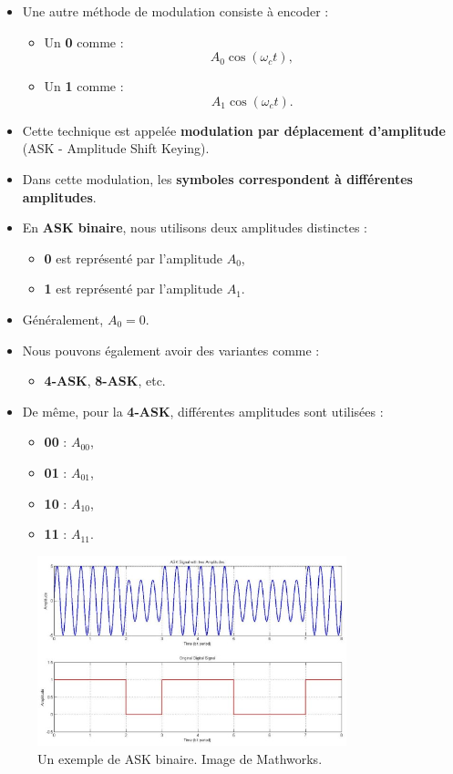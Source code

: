 \begin{itemize}
    \item Une autre méthode de modulation consiste à encoder :
    \begin{itemize}
        \item Un \textbf{0} comme :
        \[
        A_0 \cos(\omega_c t),
        \]
        \item Un \textbf{1} comme :
        \[
        A_1 \cos(\omega_c t).
        \]
    \end{itemize}
    \item Cette technique est appelée \textbf{modulation par déplacement d'amplitude} (ASK - Amplitude Shift Keying).
    \item Dans cette modulation, les \textbf{symboles correspondent à différentes amplitudes}.
    \item En \textbf{ASK binaire}, nous utilisons deux amplitudes distinctes :
    \begin{itemize}
        \item \textbf{0} est représenté par l'amplitude $A_0$,
        \item \textbf{1} est représenté par l'amplitude $A_1$.
    \end{itemize}
    \item Généralement, $A_0 = 0$.
    \item Nous pouvons également avoir des variantes comme :
    \begin{itemize}
        \item \textbf{4-ASK}, \textbf{8-ASK}, etc.
    \end{itemize}
    \item De même, pour la \textbf{4-ASK}, différentes amplitudes sont utilisées :
    \begin{itemize}
        \item \textbf{00} : $A_{00}$,
        \item \textbf{01} : $A_{01}$,
        \item \textbf{10} : $A_{10}$,
        \item \textbf{11} : $A_{11}$.
    \end{itemize}
\end{itemize}
\begin{figure}[H] %
    \centering
    \includegraphics[width=0.8\textwidth]{figures/6-41.jpg}
    \caption{Un exemple de ASK binaire. Image de Mathworks.}
    \label{fig:communication2}
\end{figure}
